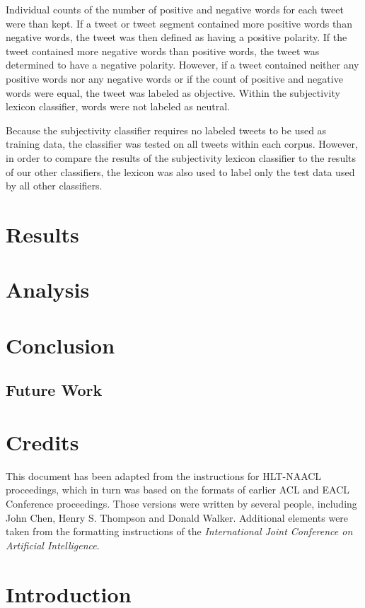 \documentclass[11pt]{article}
\begin{document}
\indent Individual counts of the number of positive and negative words for each tweet were than kept. If a tweet or tweet segment contained more positive words than negative words, the tweet was then defined as having a positive polarity. If the tweet contained more negative words than positive words, the tweet was determined to have a negative polarity. However, if a tweet contained neither any positive words nor any negative words or if the count of positive and negative words were equal, the tweet was labeled as objective. Within the subjectivity lexicon classifier, words were not labeled as neutral.

\indent Because the subjectivity classifier requires no labeled tweets to be used as training data, the classifier was tested on all tweets within each corpus. However, in order to compare the results of the subjectivity lexicon classifier to the results of our other classifiers, the lexicon was also used to label only the test data used by all other classifiers.

\section{Results}

\section{Analysis}

\section{Conclusion}
\subsection{Future Work}

\section{Credits}

This document has been adapted from the instructions for HLT-NAACL
proceedings, which in turn was based on the formats of earlier ACL and
EACL Conference proceedings.  Those versions were written by several
people, including John Chen, Henry S. Thompson and Donald Walker.
Additional elements were taken from the formatting instructions of the
{\em International Joint Conference on Artificial Intelligence}.

\section{Introduction}
\end{document}
